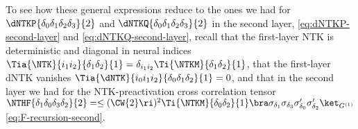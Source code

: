 To see how these general expressions reduce to the ones we had for $\dNTKP{\delta_0\delta_1\delta_2\delta_3}{2}$  and $ \dNTKQ{\delta_0\delta_1\delta_2\delta_3}{2}$ in the second layer, \eqref{eq:dNTKP-second-layer} and \eqref{eq:dNTKQ-second-layer}, recall that
the first-layer NTK is deterministic and diagonal in neural indices $\Tia{\NTK}{i_1i_2}{\delta_1\delta_2}{1}=\delta_{i_1i_2}\Ti{\NTKM}{\delta_1\delta_2}{1}$, that the first-layer dNTK vanishes $\Tia{\dNTK}{i_0i_1i_2}{\delta_0\delta_1\delta_2}{1}=0$, and that in the second layer we had for the NTK-preactivation cross correlation tensor $\NTHF{\delta_1\delta_0\delta_3\delta_2}{2}=\le(\CW{2}\ri)^2\Ti{\NTKM}{\delta_0\delta_2}{1}\bra\sigma_{\delta_1}\sigma_{\delta_3}\sigma^{\prime}_{\delta_0}\sigma^{\prime}_{\delta_2}\ket_{G^{(1)}}$ \eqref{eq:F-recursion-second}.





